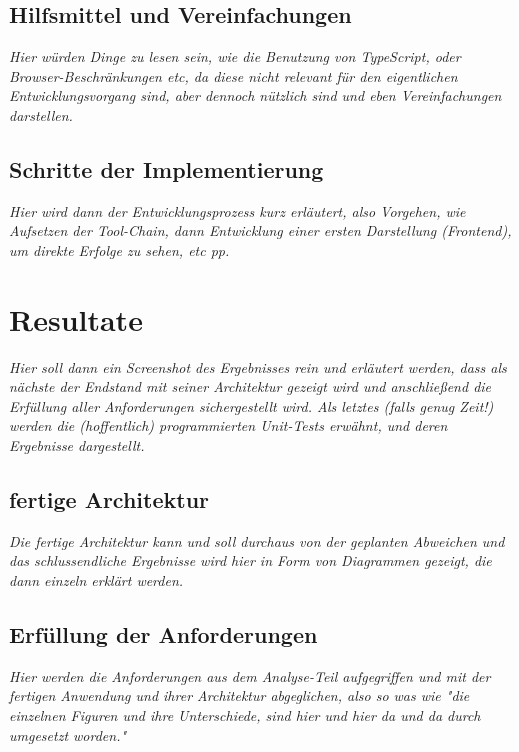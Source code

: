 \subsection{Hilfsmittel und Vereinfachungen}
\label{subsec:Hilfsmittel}

\emph{Hier würden Dinge zu lesen sein, wie die Benutzung von TypeScript, oder Browser-Beschränkungen etc, da diese nicht relevant für den eigentlichen Entwicklungsvorgang sind, aber dennoch nützlich sind und eben Vereinfachungen darstellen.}

\subsection{Schritte der Implementierung}
\label{subsec:Implementierung}

\emph{Hier wird dann der Entwicklungsprozess kurz erläutert, also Vorgehen, wie Aufsetzen der Tool-Chain, dann Entwicklung einer ersten Darstellung (Frontend), um direkte Erfolge zu sehen, etc pp.}

\section{Resultate}
\label{sec:Resultate}

\emph{Hier soll dann ein Screenshot des Ergebnisses rein und erläutert werden, dass als nächste der Endstand mit seiner Architektur gezeigt wird und anschließend die Erfüllung aller Anforderungen sichergestellt wird. Als letztes (falls genug Zeit!) werden die (hoffentlich) programmierten Unit-Tests erwähnt, und deren Ergebnisse dargestellt.}

\subsection{fertige Architektur}
\label{subsec:f_architektur}

\emph{Die fertige Architektur kann und soll durchaus von der geplanten Abweichen und das schlussendliche Ergebnisse wird hier in Form von Diagrammen gezeigt, die dann einzeln erklärt werden.}

\subsection{Erfüllung der Anforderungen}
\label{subsec:erfullung_anforderungen}

\emph{Hier werden die Anforderungen aus dem Analyse-Teil aufgegriffen und mit der fertigen Anwendung und ihrer Architektur abgeglichen, also so was wie "die einzelnen Figuren und ihre Unterschiede, sind hier und hier da und da durch umgesetzt worden."}

